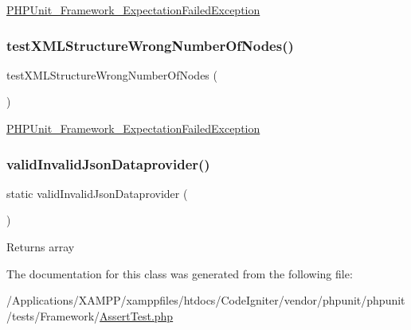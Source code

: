 \mbox{\hyperlink{class_p_h_p_unit___framework___expectation_failed_exception}{P\+H\+P\+Unit\+\_\+\+Framework\+\_\+\+Expectation\+Failed\+Exception}} \mbox{\label{class_framework___assert_test_a4b819d3bae77f889d2d45dd4d960c4c9}} 
\subsubsection{\texorpdfstring{test\+X\+M\+L\+Structure\+Wrong\+Number\+Of\+Nodes()}{testXMLStructureWrongNumberOfNodes()}}
{\footnotesize\ttfamily test\+X\+M\+L\+Structure\+Wrong\+Number\+Of\+Nodes (\begin{DoxyParamCaption}{ }\end{DoxyParamCaption})}

\mbox{\hyperlink{class_p_h_p_unit___framework___expectation_failed_exception}{P\+H\+P\+Unit\+\_\+\+Framework\+\_\+\+Expectation\+Failed\+Exception}} \mbox{\label{class_framework___assert_test_a041825ac51dcd0510be11c37121522c2}} 
\subsubsection{\texorpdfstring{valid\+Invalid\+Json\+Dataprovider()}{validInvalidJsonDataprovider()}}
{\footnotesize\ttfamily static valid\+Invalid\+Json\+Dataprovider (\begin{DoxyParamCaption}{ }\end{DoxyParamCaption})\hspace{0.3cm}{\ttfamily [static]}}

\begin{DoxyReturn}{Returns}
array 
\end{DoxyReturn}


The documentation for this class was generated from the following file\+:\begin{DoxyCompactItemize}
\item 
/\+Applications/\+X\+A\+M\+P\+P/xamppfiles/htdocs/\+Code\+Igniter/vendor/phpunit/phpunit/tests/\+Framework/\mbox{\hyperlink{_assert_test_8php}{Assert\+Test.\+php}}\end{DoxyCompactItemize}
